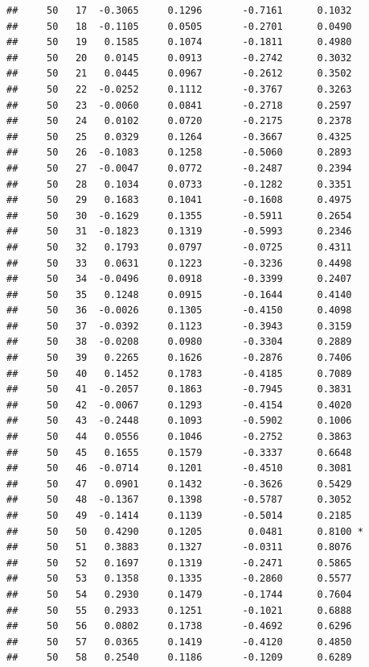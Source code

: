 \documentclass[
]{article}
\begin{document}
\begin{verbatim}
##     50   17  -0.3065     0.1296       -0.7161      0.1032  
##     50   18  -0.1105     0.0505       -0.2701      0.0490  
##     50   19   0.1585     0.1074       -0.1811      0.4980  
##     50   20   0.0145     0.0913       -0.2742      0.3032  
##     50   21   0.0445     0.0967       -0.2612      0.3502  
##     50   22  -0.0252     0.1112       -0.3767      0.3263  
##     50   23  -0.0060     0.0841       -0.2718      0.2597  
##     50   24   0.0102     0.0720       -0.2175      0.2378  
##     50   25   0.0329     0.1264       -0.3667      0.4325  
##     50   26  -0.1083     0.1258       -0.5060      0.2893  
##     50   27  -0.0047     0.0772       -0.2487      0.2394  
##     50   28   0.1034     0.0733       -0.1282      0.3351  
##     50   29   0.1683     0.1041       -0.1608      0.4975  
##     50   30  -0.1629     0.1355       -0.5911      0.2654  
##     50   31  -0.1823     0.1319       -0.5993      0.2346  
##     50   32   0.1793     0.0797       -0.0725      0.4311  
##     50   33   0.0631     0.1223       -0.3236      0.4498  
##     50   34  -0.0496     0.0918       -0.3399      0.2407  
##     50   35   0.1248     0.0915       -0.1644      0.4140  
##     50   36  -0.0026     0.1305       -0.4150      0.4098  
##     50   37  -0.0392     0.1123       -0.3943      0.3159  
##     50   38  -0.0208     0.0980       -0.3304      0.2889  
##     50   39   0.2265     0.1626       -0.2876      0.7406  
##     50   40   0.1452     0.1783       -0.4185      0.7089  
##     50   41  -0.2057     0.1863       -0.7945      0.3831  
##     50   42  -0.0067     0.1293       -0.4154      0.4020  
##     50   43  -0.2448     0.1093       -0.5902      0.1006  
##     50   44   0.0556     0.1046       -0.2752      0.3863  
##     50   45   0.1655     0.1579       -0.3337      0.6648  
##     50   46  -0.0714     0.1201       -0.4510      0.3081  
##     50   47   0.0901     0.1432       -0.3626      0.5429  
##     50   48  -0.1367     0.1398       -0.5787      0.3052  
##     50   49  -0.1414     0.1139       -0.5014      0.2185  
##     50   50   0.4290     0.1205        0.0481      0.8100 *
##     50   51   0.3883     0.1327       -0.0311      0.8076  
##     50   52   0.1697     0.1319       -0.2471      0.5865  
##     50   53   0.1358     0.1335       -0.2860      0.5577  
##     50   54   0.2930     0.1479       -0.1744      0.7604  
##     50   55   0.2933     0.1251       -0.1021      0.6888  
##     50   56   0.0802     0.1738       -0.4692      0.6296  
##     50   57   0.0365     0.1419       -0.4120      0.4850  
##     50   58   0.2540     0.1186       -0.1209      0.6289  

\end{verbatim}
\end{document}
